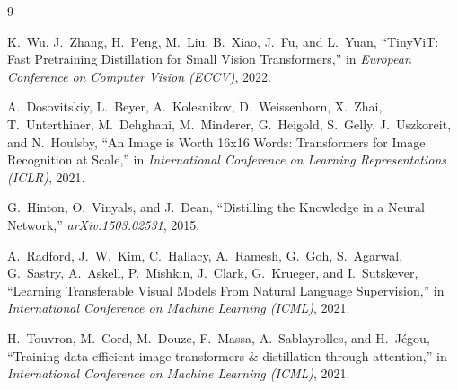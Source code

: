 \documentclass[10pt,twocolumn]{article}
\begin{document}

\begin{thebibliography}{9}

K.~Wu, J.~Zhang, H.~Peng, M.~Liu, B.~Xiao, J.~Fu, and L.~Yuan,
``TinyViT: Fast Pretraining Distillation for Small Vision Transformers,''
in \emph{European Conference on Computer Vision (ECCV)}, 2022.

A.~Dosovitskiy, L.~Beyer, A.~Kolesnikov, D.~Weissenborn, X.~Zhai,
T.~Unterthiner, M.~Dehghani, M.~Minderer, G.~Heigold, S.~Gelly, J.~Uszkoreit,
and N.~Houlsby,
``An Image is Worth 16x16 Words: Transformers for Image Recognition at Scale,''
in \emph{International Conference on Learning Representations (ICLR)}, 2021.

G.~Hinton, O.~Vinyals, and J.~Dean,
``Distilling the Knowledge in a Neural Network,''
\emph{arXiv:1503.02531}, 2015.

A.~Radford, J.~W.~Kim, C.~Hallacy, A.~Ramesh, G.~Goh, S.~Agarwal,
G.~Sastry, A.~Askell, P.~Mishkin, J.~Clark, G.~Krueger, and I.~Sutskever,
``Learning Transferable Visual Models From Natural Language Supervision,''
in \emph{International Conference on Machine Learning (ICML)}, 2021.

H.~Touvron, M.~Cord, M.~Douze, F.~Massa, A.~Sablayrolles, and H.~J{\'e}gou,
``Training data-efficient image transformers \& distillation through attention,''
in \emph{International Conference on Machine Learning (ICML)}, 2021.

\end{thebibliography}
\end{document}
